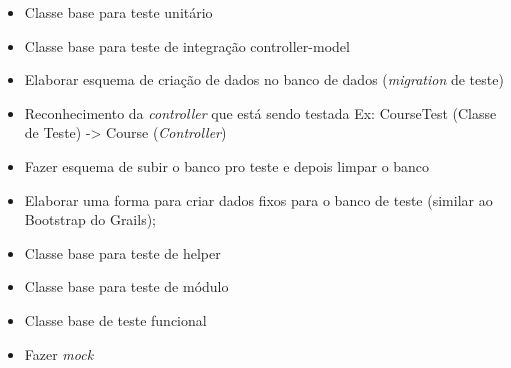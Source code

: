 \begin{itemize}

	\item Classe base para teste unitário
	\item Classe base para teste de integração controller-model
	\item Elaborar esquema de criação de dados no banco de dados (\textit{migration} de teste)
	\item Reconhecimento da \textit{controller} que está sendo testada
		\subitem Ex: CourseTest (Classe de Teste) -> Course (\textit{Controller})
	\item Fazer esquema de subir o banco pro teste e depois limpar o banco
	\item Elaborar uma forma para criar dados fixos para o banco de teste (similar ao Bootstrap do Grails);
	\item Classe base para teste de helper
	\item Classe base para teste de módulo
	\item Classe base de teste funcional
	\item Fazer \textit{mock}

\end{itemize}